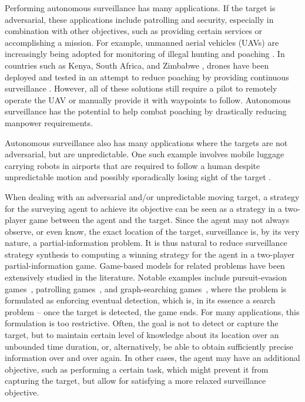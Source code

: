 

Performing autonomous surveillance has many applications. If the target is adversarial, these applications include patrolling and security, especially in combination with other objectives, such as providing certain services or accomplishing a mission. For example, unmanned aerial vehicles (UAVs) are increasingly being adopted for monitoring of illegal hunting and poaching \cite{poaching}. In countries such as Kenya, South Africa, and Zimbabwe \cite{drones}, drones have been deployed and tested in an attempt to reduce poaching by providing continuous surveillance \cite{poaching}. However, all of these solutions still require a pilot to remotely operate the UAV or manually provide it with waypoints to follow. Autonomous surveillance has the potential to help combat poaching by drastically reducing manpower requirements. 

Autonomous surveillance also has many applications where the targets are not adversarial, but are unpredictable. One such example involves mobile luggage carrying robots in airports that are required to follow a human despite unpredictable motion and possibly sporadically losing sight of the target \cite{GonBanos02}. 

When dealing with an adversarial and/or unpredictable moving target, a strategy for the surveying agent to achieve its objective can be seen as a strategy in a two-player game between the agent and the target. Since the agent may not always observe, or even know, the exact location of the target, surveillance is, by its very nature, a partial-information problem.
It is thus natural to reduce surveillance strategy synthesis to computing a winning strategy for the agent in a two-player partial-information game. Game-based models for related problems have been extensively studied in the literature. Notable examples include pursuit-evasion games~\cite{Chung2011}, patrolling games~\cite{Basilico12}, and graph-searching games~\cite{Kreutzer11}, where the problem is formulated as enforcing eventual detection, which is, in its essence a search problem -- once the target is detected, the game ends. For many applications, this formulation is too restrictive. Often, the goal is not to detect or capture the target, but to maintain certain level of knowledge about its location over an unbounded time duration, or, alternatively, be able to obtain sufficiently precise information over and over again. In other cases, the agent may have an additional objective, such as performing a certain task, which might prevent it from capturing the target, but allow for satisfying a more relaxed surveillance objective.

